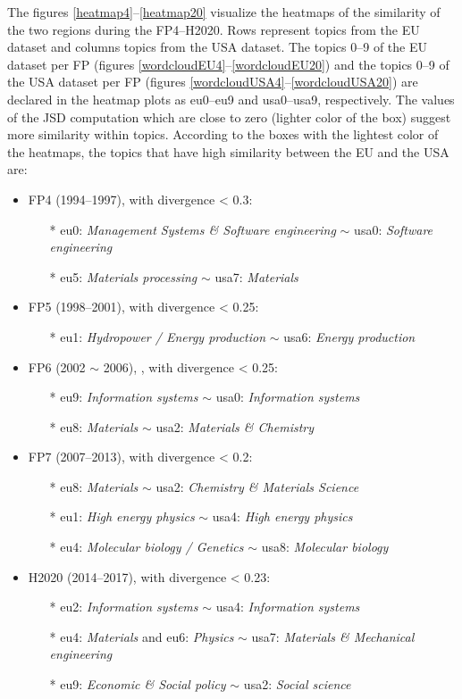 \documentclass[12pt]{report}
\begin{document}
The figures \ref{heatmap4}--\ref{heatmap20} visualize the heatmaps of
the similarity of the two regions during the FP4--H2020. Rows represent
topics from the EU dataset and columns topics from the USA dataset.
The topics 0--9 of the EU dataset per FP (figures \ref{wordcloudEU4}--\ref{wordcloudEU20}) and the topics 0--9 of the USA dataset per FP (figures \ref{wordcloudUSA4}--\ref{wordcloudUSA20}) are declared in the heatmap plots as
eu0--eu9 and usa0--usa9, respectively.
The values of the JSD computation which are close to zero (lighter
color of the box) suggest more similarity within topics. According to 
the boxes with the lightest color of the heatmaps, 
the topics that have high similarity between the EU and the USA are:

\begin{itemize}
\item FP4 (1994--1997), with divergence < 0.3:
\begin{itemize}
\item[*] eu0: \emph{Management Systems \& Software engineering} $\sim$ usa0: \emph{Software engineering}
\item[*] eu5: \emph{Materials processing} $\sim$ usa7: \emph{Materials}
\end{itemize}
\item FP5 (1998--2001), with divergence < 0.25:
\begin{itemize}
\item[*] eu1: \emph{Hydropower / Energy production} $\sim$ usa6: \emph{Energy production}
\end{itemize}
\item FP6 (2002 $\sim$ 2006), , with divergence < 0.25:
\begin{itemize}
\item[*] eu9: \emph{Information systems} $\sim$ usa0: \emph{Information systems}
\item[*] eu8: \emph{Materials} $\sim$ usa2: \emph{Materials \& Chemistry}
\end{itemize}
\item FP7 (2007--2013), with divergence < 0.2:
\begin{itemize}
\item[*] eu8: \emph{Materials} $\sim$ usa2: \emph{Chemistry \& Materials Science}
\item[*] eu1: \emph{High energy physics} $\sim$ usa4: \emph{High energy physics}
\item[*] eu4: \emph{Molecular biology / Genetics} $\sim$ usa8: \emph{Molecular biology}
\end{itemize}
\item H2020 (2014--2017), with divergence < 0.23:
\begin{itemize}
\item[*] eu2: \emph{Information systems} $\sim$ usa4: \emph{Information systems}
\item[*] eu4: \emph{Materials} and eu6: \emph{Physics} $\sim$ usa7: \emph{Materials \& Mechanical engineering}
\item[*] eu9: \emph{Economic \& Social policy} $\sim$ usa2: \emph{Social science}
\end{itemize}
\end{itemize}
\end{document}

